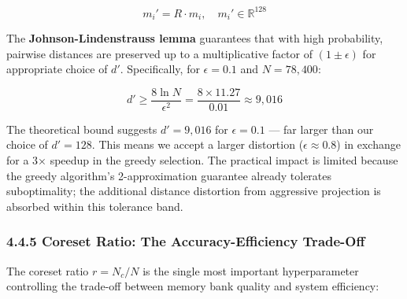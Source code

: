 \[m_i' = R \cdot m_i, \quad m_i' \in \mathbb{R}^{128}\]

The \textbf{Johnson-Lindenstrauss lemma} guarantees that with high probability, pairwise distances are preserved up to a multiplicative factor of \((1 \pm \epsilon)\) for appropriate choice of \(d'\). Specifically, for \(\epsilon = 0.1\) and \(N = 78{,}400\):

\[d' \geq \frac{8 \ln N}{\epsilon^2} = \frac{8 \times 11.27}{0.01} \approx 9{,}016\]

The theoretical bound suggests \(d' = 9{,}016\) for \(\epsilon = 0.1\) --- far larger than our choice of \(d' = 128\). This means we accept a larger distortion (\(\epsilon \approx 0.8\)) in exchange for a 3× speedup in the greedy selection. The practical impact is limited because the greedy algorithm's 2-approximation guarantee already tolerates suboptimality; the additional distance distortion from aggressive projection is absorbed within this tolerance band.

\subsubsection{4.4.5 Coreset Ratio: The Accuracy-Efficiency Trade-Off}\label{coreset-ratio-the-accuracy-efficiency-trade-off}

The coreset ratio \(r = N_c / N\) is the single most important hyperparameter controlling the trade-off between memory bank quality and system efficiency:

